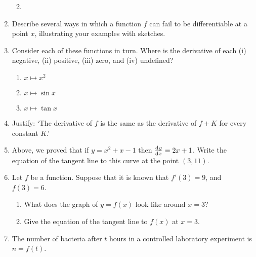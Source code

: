 \begin{enumerate}
\begin{multicols}{2}
\begin{enumerate}
      \item
    \end{enumerate}
    \end{multicols}
  \item Describe several ways in which a function $ f $ can fail to be differentiable at a point $ x $, illustrating your examples with sketches.
  \item Consider each of these functions in turn. Where is the derivative of each (i) negative, (ii) positive, (iii) zero, and (iv) undefined?
    \begin{enumerate}
      \item $ x \mapsto x^2 $
      \item $ x \mapsto \sin x $
      \item $ x \mapsto \tan x $
    \end{enumerate}
  \item Justify: `The derivative of $ f $ is the same as the derivative of $ f + K $ for every constant $ K $.'
  \item Above, we proved that if $ y = x^2 + x - 1 $ then $ \od{y}{x} = 2x + 1 $. Write the equation of the
        tangent line to this curve at the point $ (3, 11) $.
  \item Let $ f $ be a function. Suppose that it is known that $ f'(3) = 9 $, and $ f(3) = 6 $.
    \begin{enumerate}
      \item What does the graph of $ y = f(x) $ look like around $ x = 3 $?
      \item Give the equation of the tangent line to $ f(x) $ at $ x = 3 $.
    \end{enumerate}
  \item The number of bacteria after $ t $ hours in a controlled laboratory experiment is $ n = f(t) $.
    \begin{enumerate}

\end{enumerate}
\end{enumerate}
